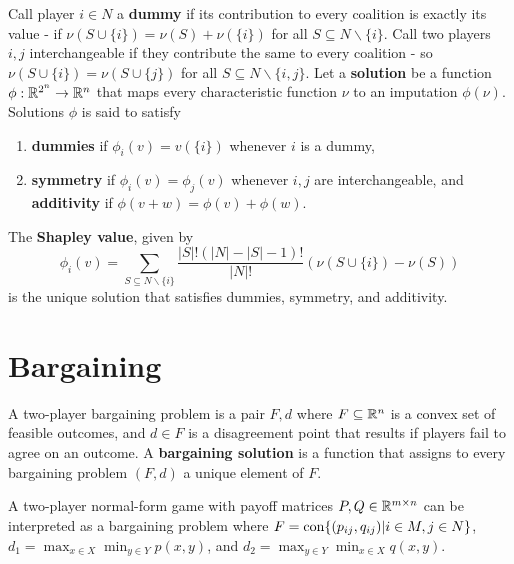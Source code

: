 \begin{defn}
  \label{sec:cooperative-games-7}
  Call player $i \in N$ a \textbf{dummy} if its contribution to every
  coalition is exactly its value - if $\nu(S \cup \{ i \} ) = \nu(S) +
  \nu(\{ i \} )$ for all $S \subseteq N \backslash \{ i \} $. Call two
  players $i, j$ interchangeable if they contribute the same to every
  coalition - so $\nu(S \cup \{ i \} ) = \nu(S \cup \{ j \} )$ for all
  $S \subseteq N \backslash \{ i, j \} $. Let a \textbf{solution} be a
  function $\phi: \mathbb{R}^{2^{n}} \rightarrow \mathbb{R}^{n}$ that maps every
  characteristic function $\nu$ to an imputation $\phi(\nu)$.
  Solutions $\phi$ is said to satisfy
  \begin{enumerate}
  \item \textbf{dummies} if $\phi_{i}(v) = v(\{ i \} )$ whenever $i$
    is a dummy,
  \item \textbf{symmetry} if $\phi_{i}(v) = \phi_{j}(v)$ whenever $i,
    j$ are interchangeable, and \textbf{additivity} if $\phi(v + w) =
    \phi(v) + \phi(w)$.
  \end{enumerate}
\end{defn}
\begin{thm}
  \label{sec:cooperative-games-8}
  The \textbf{Shapley value}, given by
  \begin{equation}
    \label{eq:21}
    \phi_{i}(v) = \sum_{S \subseteq N \backslash \{ i \} }^{}
    \frac{|S|!(|N| - |S| - 1)!}{|N|!} (\nu(S \cup \{ i \} ) - \nu(S))
  \end{equation} is the unique solution that satisfies dummies,
  symmetry, and additivity.
\end{thm}

\section{Bargaining}
\label{sec:bargaining}

\begin{defn}
  \label{sec:bargaining-1}
  A two-player bargaining problem is a pair $F, d$ where $F \subseteq
  \mathbb{R}^{n}$ is a convex set of feasible outcomes, and $d \in F$ is a
  disagreement point that results if players fail to agree on an
  outcome.  A \textbf{bargaining solution} is a function that assigns
  to every bargaining problem $(F, d)$ a unique element of $F$.

  A two-player normal-form game with payoff matrices $P, Q \in \mathbb{R}^{m
    \times n}$ can be interpreted as a bargaining problem where $F =
  \operatorname*{con} \{ (p_{ij}, q_{ij}) | i \in M, j \in N \} $, $d_{1} = \max_{x
    \in X} \min_{y \in Y} p(x, y)$, and $d_{2} = \max_{y \in Y}
  \min_{x \in X} q(x, y)$.
\end{defn}

